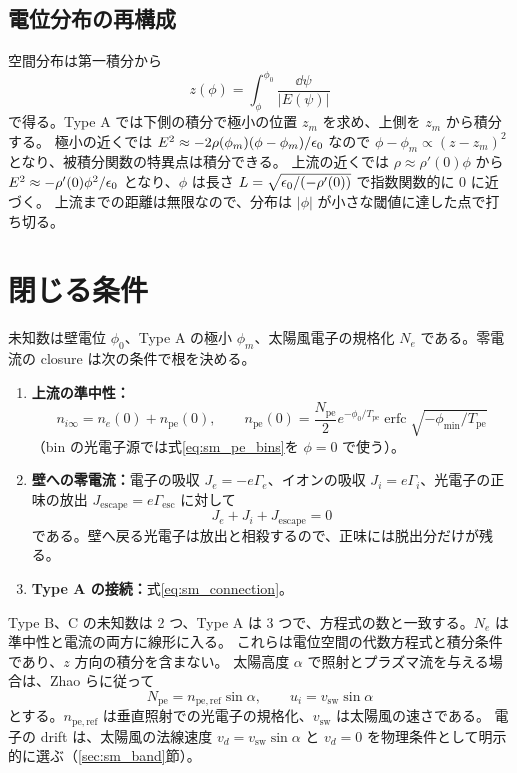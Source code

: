 

\subsection{電位分布の再構成}
空間分布は第一積分から
\begin{equation}
 z(\phi)=\int_\phi^{\phi_0}\frac{\dd\psi}{|E(\psi)|}
 \label{eq:sm_z_of_phi}
\end{equation}
で得る。Type A では下側の積分で極小の位置 $z_m$ を求め、上側を $z_m$ から積分する。
極小の近くでは $E^2\approx-2\rho(\phi_m)(\phi-\phi_m)/\epsilon_0$ なので $\phi-\phi_m\propto(z-z_m)^2$ となり、被積分関数の特異点は積分できる。
上流の近くでは $\rho\approx\rho'(0)\phi$ から $E^2\approx-\rho'(0)\phi^2/\epsilon_0$ となり、$\phi$ は長さ $L=\sqrt{\epsilon_0/(-\rho'(0))}$ で指数関数的に 0 に近づく。
上流までの距離は無限なので、分布は $|\phi|$ が小さな閾値に達した点で打ち切る。

\section{閉じる条件}
\label{sec:sm_closure}
未知数は壁電位 $\phi_0$、Type A の極小 $\phi_m$、太陽風電子の規格化 $N_e$ である。零電流の closure は次の条件で根を決める。
\begin{enumerate}
\item \textbf{上流の準中性：}
 \begin{equation}
  n_{i\infty}=n_e(0)+n_{\mathrm{pe}}(0),\qquad
  n_{\mathrm{pe}}(0)=\frac{N_{\mathrm{pe}}}2e^{-\phi_0/T_{\mathrm{pe}}}\operatorname{erfc}\sqrt{-\phi_{\min}/T_{\mathrm{pe}}}
  \label{eq:sm_neutrality}
 \end{equation}
 （bin の光電子源では式\eqref{eq:sm_pe_bins}を $\phi=0$ で使う）。
\item \textbf{壁への零電流：}電子の吸収 $J_e=-e\Gamma_e$、イオンの吸収 $J_i=e\Gamma_i$、光電子の正味の放出 $J_{\mathrm{escape}}=e\Gamma_{\mathrm{esc}}$ に対して
 \begin{equation}
  J_e+J_i+J_{\mathrm{escape}}=0
  \label{eq:zero_current}
 \end{equation}
 である。壁へ戻る光電子は放出と相殺するので、正味には脱出分だけが残る。
\item \textbf{Type A の接続：}式\eqref{eq:sm_connection}。
\end{enumerate}
Type B、C の未知数は 2 つ、Type A は 3 つで、方程式の数と一致する。$N_e$ は準中性と電流の両方に線形に入る。
これらは電位空間の代数方程式と積分条件であり、$z$ 方向の積分を含まない。
太陽高度 $\alpha$ で照射とプラズマ流を与える場合は、Zhao らに従って
\begin{equation}
 N_{\mathrm{pe}}=n_{\mathrm{pe,ref}}\sin\alpha,\qquad u_i=v_{\mathrm{sw}}\sin\alpha
 \label{eq:sm_illumination}
\end{equation}
とする。$n_{\mathrm{pe,ref}}$ は垂直照射での光電子の規格化、$v_{\mathrm{sw}}$ は太陽風の速さである。
電子の drift は、太陽風の法線速度 $v_d=v_{\mathrm{sw}}\sin\alpha$ と $v_d=0$ を物理条件として明示的に選ぶ（\ref{sec:sm_band}節）。

